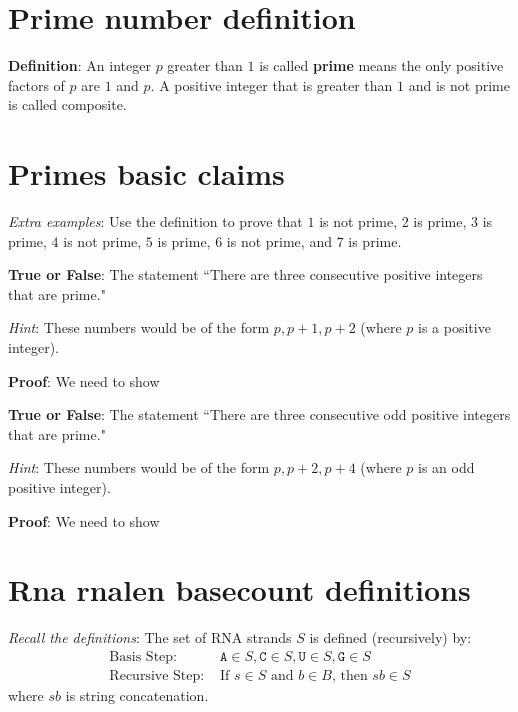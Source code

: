 \documentclass[12pt, oneside]{article}
\newcommand{\A}[0]{\texttt{A}}
\newcommand{\C}[0]{\texttt{C}}
\newcommand{\G}[0]{\texttt{G}}
\newcommand{\U}[0]{\texttt{U}}
\begin{document}
\section*{Prime number definition}


{\bf Definition}:  An integer $p$ greater than $1$ is called {\bf prime} means 
the only positive factors of 
$p$ are $1$ and $p$. A positive integer that is greater than $1$ and is not prime 
is called composite. \vfill
\section*{Primes basic claims}


{\it Extra examples}: Use the definition to prove that $1$ is not prime, $2$ is prime, $3$
is prime, $4$ is not prime, $5$ is prime, $6$ is not prime, and $7$ is prime.


{\bf True or False}: The statement ``There are three consecutive positive integers that are prime."

{\it Hint}: These numbers would be of the form $p, p+1, p+2$ (where $p$ is a positive integer).

{\bf Proof}: We need to show \underline{}

\vspace{200pt}

{\bf True or False}: The statement ``There are three consecutive odd positive integers that are prime."

{\it Hint}: These numbers would be of the form $p, p+2, p+4$ (where $p$ is an odd positive integer).

{\bf Proof}: We need to show \underline{}

\vspace{200pt}
 \vfill
\section*{Rna rnalen basecount definitions}


{\it Recall the definitions}: The set of RNA strands $S$ is defined (recursively) by:
\[
\begin{array}{ll}
\textrm{Basis Step: } & \A \in S, \C \in S, \U \in S, \G \in S \\
\textrm{Recursive Step: } & \textrm{If } s \in S\textrm{ and }b \in B \textrm{, then }sb \in S
\end{array}
\]
where $sb$ is string concatenation.
\end{document}
